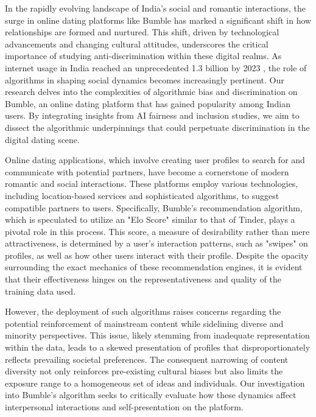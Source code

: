 In the rapidly evolving landscape of India's social and romantic interactions, the surge in online dating platforms like Bumble has marked a significant shift in how relationships are formed and nurtured. This shift, driven by technological advancements and changing cultural attitudes, underscores the critical importance of studying anti-discrimination within these digital realms. As internet usage in India reached an unprecedented 1.3 billion by 2023 \cite{statista_internet_users_2050}, the role of algorithms in shaping social dynamics becomes increasingly pertinent. Our research delves into the complexities of algorithmic bias and discrimination on Bumble, an online dating platform that has gained popularity among Indian users. By integrating insights from AI fairness and inclusion studies, we aim to dissect the algorithmic underpinnings that could perpetuate discrimination in the digital dating scene.

Online dating applications, which involve creating user profiles to search for and communicate with potential partners, have become a cornerstone of modern romantic and social interactions. These platforms employ various technologies, including location-based services and sophisticated algorithms, to suggest compatible partners to users. Specifically, Bumble's recommendation algorithm, which is speculated to utilize an "Elo Score" similar to that of Tinder, plays a pivotal role in this process. This score, a measure of desirability rather than mere attractiveness, is determined by a user's interaction patterns, such as "swipes" on profiles, as well as how other users interact with their profile. Despite the opacity surrounding the exact mechanics of these recommendation engines, it is evident that their effectiveness hinges on the representativeness and quality of the training data used.

However, the deployment of such algorithms raises concerns regarding the potential reinforcement of mainstream content while sidelining diverse and minority perspectives.\cite{davidson-etal-2019-racial} This issue, likely stemming from inadequate representation within the data, leads to a skewed presentation of profiles that disproportionately reflects prevailing societal preferences. The consequent narrowing of content diversity not only reinforces pre-existing cultural biases but also limits the exposure range to a homogeneous set of ideas and individuals. Our investigation into Bumble's algorithm seeks to critically evaluate how these dynamics affect interpersonal interactions and self-presentation on the platform.

